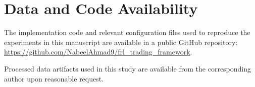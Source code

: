 \section{Data and Code Availability}
\label{app:data_code_availability}

The implementation code and relevant configuration files used to reproduce the experiments in this manuscript are available in a public GitHub repository:
\url{https://github.com/NabeelAhmad9/frl_trading_framework}.

Processed data artifacts used in this study are available from the corresponding author upon reasonable request.
